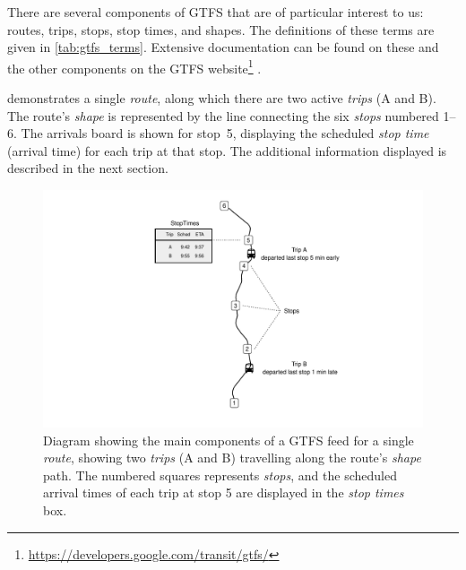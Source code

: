 There are several components of GTFS that are of particular interest to us: routes, trips, stops, stop times, and shapes. The definitions of these terms are given in \cref{tab:gtfs_terms}. Extensive documentation can be found on these and the other components on the GTFS website\footnote{\url{https://developers.google.com/transit/gtfs/}} \citep{GoogleDevelopers_2006}.


 demonstrates a single \emph{route}, along which there are two active \emph{trips} (A and B). The route's \emph{shape} is represented by the line connecting the six \emph{stops} numbered 1--6. The \rt{} arrivals board is shown for stop~5, displaying the scheduled \emph{stop time} (arrival time) for each trip at that stop. The additional information displayed is described in the next section.



\begin{knitrout}\small
{}\color{fgcolor}\begin{figure}

{\centering \includegraphics[width=\textwidth]{figure/gtfs_nw-1} 

}

\caption[Diagram of the main components of a GTFS feed]{Diagram showing the main components of a GTFS feed for a single \emph{route}, showing two \emph{trips} (A and B) travelling along the route's \emph{shape} path. The numbered squares represents \emph{stops}, and the scheduled arrival times of each trip at stop 5 are displayed in the \emph{stop times} box.}\label{fig:gtfs_nw}
\end{figure}


\end{knitrout}



